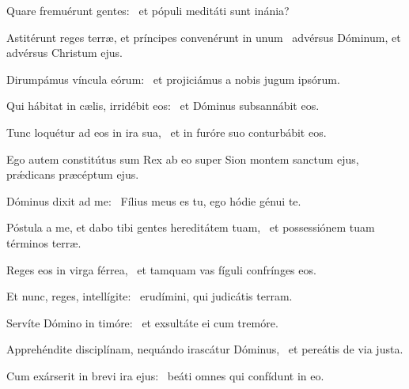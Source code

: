 \item Quare fremuérunt gentes:~\psstar{} et pópuli meditáti sunt inánia?

\item Astitérunt reges terræ, et príncipes convenérunt in unum~\psstar{} advérsus Dóminum, et advérsus Christum ejus.

\item Dirumpámus víncula eórum:~\psstar{} et projiciámus a nobis jugum ipsórum.

\item Qui hábitat in cælis, irridébit eos:~\psstar{} et Dóminus subsannábit eos.

\item Tunc loquétur ad eos in ira sua,~\psstar{} et in furóre suo conturbábit eos.

\item Ego autem constitútus sum Rex ab eo super Sion montem sanctum ejus,~\psstar{} prǽdicans præcéptum ejus.

\item Dóminus dixit ad me:~\psstar{} Fílius meus es tu, ego hódie génui te.

\item Póstula a me, et dabo tibi gentes hereditátem tuam,~\psstar{} et possessiónem tuam términos terræ.

\item Reges eos in virga férrea,~\psstar{} et tamquam vas fíguli confrínges eos.

\item Et nunc, reges, intellígite:~\psstar{} erudímini, qui judicátis terram.

\item Servíte Dómino in timóre:~\psstar{} et exsultáte ei cum tremóre.

\item Apprehéndite disciplínam, nequándo irascátur Dóminus,~\psstar{} et pereátis de via justa.

\item Cum exárserit in brevi ira ejus:~\psstar{} beáti omnes qui confídunt in eo.


